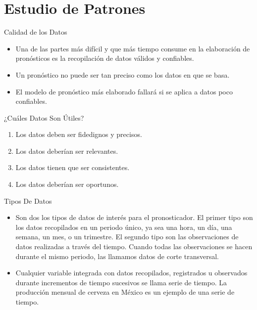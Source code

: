 
\section{Estudio de Patrones}
\label{sec:patterns}


\begin{frame}{Calidad de los Datos}

  \begin{itemize} \justifying \parskip3mm
  \item Una de las partes más difícil y que más tiempo consume en la elaboración de pronósticos es la recopilación de datos válidos y confiables.
  \item Un pronóstico no puede ser tan preciso como los datos en que se basa. 
  \item El modelo de pronóstico más elaborado fallará si se aplica a datos poco confiables.
  \end{itemize}
 
\end{frame}

\begin{frame}{¿Cuáles Datos Son Útiles?}
  
  \begin{enumerate} \justifying \parskip5mm
  \item Los datos deben ser fidedignos y precisos.
  \item Los datos deberían ser relevantes.
  \item Los datos tienen que ser consistentes.
  \item Los datos deberían ser oportunos.
  \end{enumerate}

\end{frame}

\begin{frame}{Tipos De Datos}

  \begin{itemize}\justifying
  \item   Son dos los tipos de datos de interés para el pronosticador. El primer tipo son los datos recopilados en un periodo único, ya sea una hora, un día, una semana, un mes, o un trimestre. El segundo tipo son las observaciones de datos realizadas a través del tiempo. Cuando todas las observaciones se hacen durante el mismo periodo, las llamamos \alert{datos de corte transversal}.
  \item   Cualquier variable integrada con datos recopilados, registrados u observados durante incrementos de tiempo sucesivos se llama \alert{serie de tiempo}. La producción mensual de cerveza en México es un ejemplo de una \alert{serie de tiempo}.
  \end{itemize}
\end{frame}

